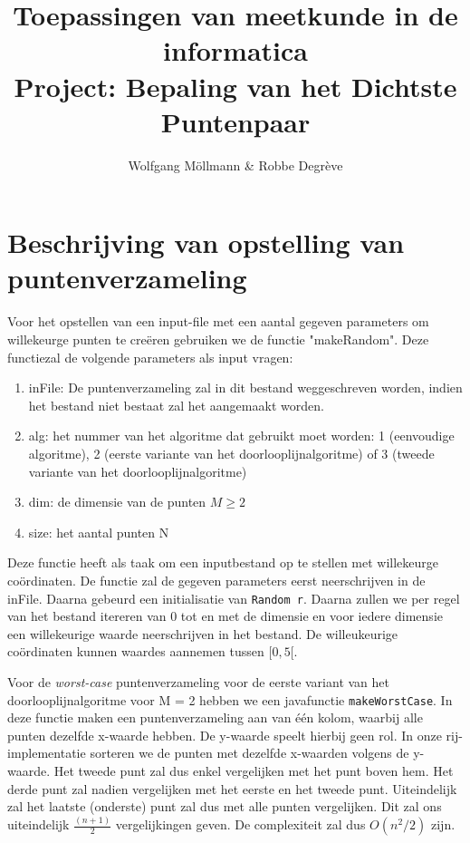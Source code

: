 \documentclass[12pt]{article}
\author{Wolfgang M\"ollmann \& Robbe Degr\`eve}
\title{Toepassingen van meetkunde in de informatica \\ Project: Bepaling van het Dichtste Puntenpaar}
\begin{document}
\maketitle

\newpage

\section{Beschrijving van opstelling van puntenverzameling}
Voor het opstellen van een input-file met een aantal gegeven parameters om willekeurge punten te creëren gebruiken we de functie "makeRandom".
Deze functiezal de volgende parameters als input vragen:
\begin{enumerate}
    \item inFile: De puntenverzameling zal in dit bestand weggeschreven worden, indien het bestand niet bestaat zal het aangemaakt worden.
    \item alg: het nummer van het algoritme dat gebruikt moet worden: 1 (eenvoudige algoritme), 2 (eerste variante van het doorlooplijnalgoritme) of 3 (tweede variante van het doorlooplijnalgoritme)
    \item dim: de dimensie van de punten $M \geq 2$
		\item size: het aantal punten N
\end{enumerate}

Deze functie heeft als taak om een inputbestand op te stellen met willekeurge co\"ordinaten.
De functie zal de gegeven parameters eerst neerschrijven in de inFile.
Daarna gebeurd een initialisatie van \texttt{Random r}.
Daarna zullen we per regel van het bestand itereren van 0 tot en met de dimensie en voor iedere dimensie een willekeurige waarde neerschrijven in het bestand.
De willeukeurige co\"ordinaten kunnen waardes aannemen tussen $[0, 5[$.

Voor de \textit{worst-case} puntenverzameling voor de eerste variant van het doorlooplijnalgoritme voor M = 2 hebben we een javafunctie \texttt{makeWorstCase}.
In deze functie maken een puntenverzameling aan van één kolom, waarbij alle punten dezelfde x-waarde hebben.
De y-waarde speelt hierbij geen rol.
In onze rij-implementatie sorteren we de punten met dezelfde x-waarden volgens de y-waarde.
Het tweede punt zal dus enkel vergelijken met het punt boven hem.
Het derde punt zal nadien vergelijken met het eerste en het tweede punt.
Uiteindelijk zal het laatste (onderste) punt zal dus met alle punten vergelijken.
Dit zal ons uiteindelijk $\frac{(n+1)}{2}$ vergelijkingen geven. De complexiteit zal dus $O(n^2/2)$ zijn.
\end{document}
